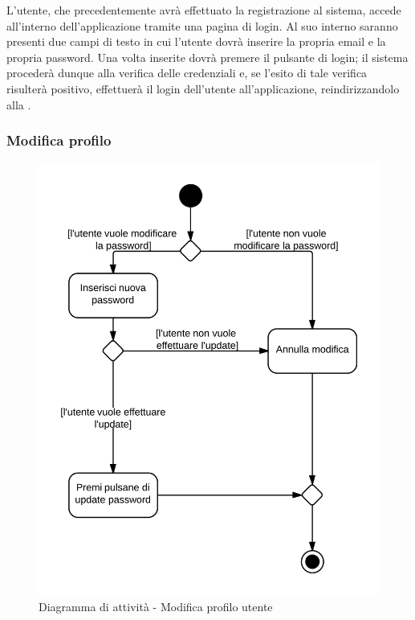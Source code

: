 L'utente, che precedentemente avrà effettuato la registrazione al sistema, accede all'interno dell'applicazione tramite una pagina di login. Al suo interno saranno presenti due campi di testo in cui l'utente dovrà inserire la propria email e la propria password. Una volta inserite dovrà premere il pulsante di login; il sistema  procederà dunque alla verifica delle credenziali e, se l'esito di tale verifica risulterà positivo, effettuerà il login dell'utente all'applicazione, reindirizzandolo alla .

\subsubsection{Modifica profilo}

\begin{figure}[H]
\centering
\includegraphics[scale=0.1]{uml/MaaP - Modifica profilo.png}
\caption{Diagramma di attività - Modifica profilo utente}
\end{figure}

